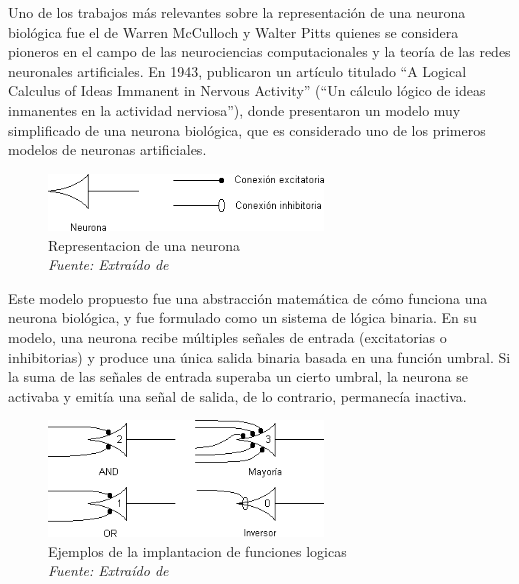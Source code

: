 Uno de los trabajos más relevantes sobre la representación de una neurona biológica fue el de Warren McCulloch y Walter Pitts quienes se considera pioneros en el campo de las neurociencias computacionales y la teoría de las redes neuronales artificiales. En 1943, publicaron un artículo titulado ``A Logical Calculus of Ideas Immanent in Nervous Activity'' (``Un cálculo lógico de ideas inmanentes en la actividad nerviosa''), donde presentaron un modelo muy simplificado de una neurona biológica, que es considerado uno de los primeros modelos de neuronas artificiales\cite{mcculloch1943logical}.

\begin{figure}[h!]
	\includegraphics[width=0.65\textwidth]{capitulo2/figuras/an2.png}
	\caption{Representacion de una neurona \\\textit{Fuente: Extraído de} \protect\cite[ p.4]{prieto2020modelo} }
	\label{fig:an2}
\end{figure}

Este modelo propuesto  fue una abstracción matemática de cómo funciona una neurona biológica, y fue formulado como un sistema de lógica binaria. En su modelo, una neurona recibe múltiples señales de entrada (excitatorias o inhibitorias) y produce una única salida binaria basada en una función umbral. Si la suma de las señales de entrada superaba un cierto umbral, la neurona se activaba y emitía una señal de salida, de lo contrario, permanecía inactiva.

\begin{figure}[h!]
	\includegraphics[width=0.65\textwidth]{capitulo2/figuras/an3.png}
	\caption{Ejemplos de la implantacion de funciones logicas
		\\\textit{Fuente: Extraído de} \protect\cite[p. 5]{prieto2020modelo} }
	\label{fig:an3}
\end{figure}

